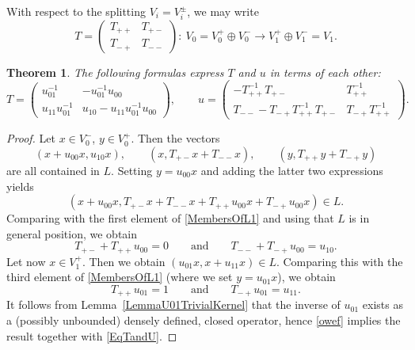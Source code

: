 \documentclass[10pt,a4paper]{amsart}
\numberwithin{equation}{section}
\newtheorem{Theorem}{Theorem}[section]
\begin{document}
With respect to the splitting $V_i = V_i^{\pm}$, we may write
\begin{equation*}
 T = \begin{pmatrix} T_{++} & T_{+-} \\ T_{-+} & T_{--} \end{pmatrix}\colon\ V_0 = V_0^+ \oplus V_0^- \longrightarrow V_1^+ \oplus V_1^- = V_1.
\end{equation*}

\begin{Theorem} \label{TheoremRelationTu}
The following formulas express $T$ and $u$ in terms of each other:
\begin{equation*}
 T = \begin{pmatrix} u_{01}^{-1} & -u_{01}^{-1} u_{00} \\ u_{11} u_{01}^{-1} & u_{10} - u_{11} u_{01}^{-1}u_{00} \end{pmatrix}, \qquad
 u = \begin{pmatrix} - T_{++}^{-1} T_{+-} & T_{++}^{-1} \\ T_{--} - T_{-+}T_{++}^{-1} T_{+-} & T_{-+}T_{++}^{-1}\end{pmatrix}.
\end{equation*}
\end{Theorem}

\begin{proof}
Let $x \in V_0^-$, $y \in V_0^+$. Then the vectors
\begin{equation} \label{MembersOfL1}
 (x + u_{00}x, u_{10} x), \qquad (x, T_{+-}x + T_{--}x), \qquad (y, T_{++}y + T_{-+} y)
 \end{equation}
 are all contained in $L$.
 Setting $y = u_{00} x$ and adding the latter two expressions yields
 \begin{equation*}
 (x + u_{00}x, T_{+-}x + T_{--}x + T_{++}u_{00}x + T_{-+} u_{00}x) \in L.
 \end{equation*}
 Comparing with the first element of \eqref{MembersOfL1} and using that $L$ is in general position, we obtain
 \begin{equation} \label{EqTandU}
 T_{+-} + T_{++}u_{00} = 0 \qquad \text{and} \qquad T_{--} + T_{-+}u_{00} = u_{10}.
 \end{equation}
 Let now $x \in V_1^+$.
 Then we obtain $(u_{01}x, x + u_{11}x) \in L$.
 Comparing this with the third element of \eqref{MembersOfL1} (where we set $y = u_{01}x$), we obtain
 \begin{equation} \label{owef}
 T_{++}u_{01} = 1 \qquad \text{and} \qquad T_{-+} u_{01} = u_{11}.
 \end{equation}
 It follows from Lemma~\ref{LemmaU01TrivialKernel} that the inverse of $u_{01}$ exists as a (possibly unbounded) densely defined, closed operator, hence \eqref{owef} implies the result together with \eqref{EqTandU}.
\end{proof}
\end{document}
